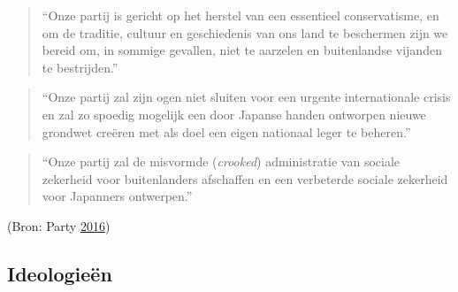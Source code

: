 \documentclass[10.5pt,dutch,]{article}
\begin{document}
\begin{quote}
``Onze partij is gericht op het herstel van een essentieel
conservatisme, en om de traditie, cultuur en geschiedenis van ons land
te beschermen zijn we bereid om, in sommige gevallen, niet te aarzelen
en buitenlandse vijanden te bestrijden.''
\end{quote}

\begin{quote}
``Onze partij zal zijn ogen niet sluiten voor een urgente internationale
crisis en zal zo spoedig mogelijk een door Japanse handen ontworpen
nieuwe grondwet creëren met als doel een eigen nationaal leger te
beheren.''
\end{quote}

\begin{quote}
``Onze partij zal de misvormde (\emph{crooked}) administratie van
sociale zekerheid voor buitenlanders afschaffen en een verbeterde
sociale zekerheid voor Japanners ontwerpen.''
\end{quote}

(Bron: Party
\protect\hyperlink{ref-japanux5ffirstux5fpartyux5fjapanux5f2016}{2016})

\subsection{Ideologieën}\label{ideologieuxebn}
\end{document}
